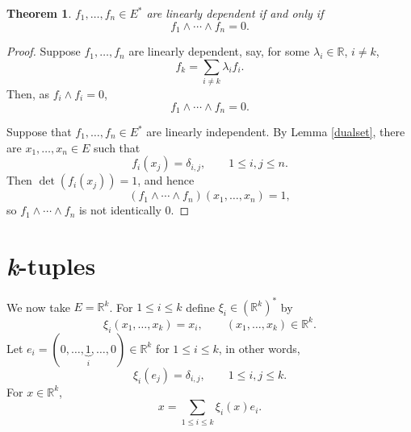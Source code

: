 \documentclass{article}
\newtheorem{theorem}{Theorem}
\theoremstyle{definition}
\begin{document}
\begin{theorem}
$f_1,\ldots,f_n \in E^*$ are linearly dependent if and only if 
\[
f_1 \wedge \cdots \wedge f_n=0.
\]
\end{theorem}
\begin{proof}
Suppose $f_1,\ldots,f_n$ are linearly dependent, say, for some
$\lambda_i \in \mathbb{R}$, $i \neq k$,
\[
f_k = \sum_{i \neq k} \lambda_i f_i.
\]
Then, as $f_i \wedge f_i =0$,
\[
f_1 \wedge \cdots \wedge f_n = 0.
\]

Suppose
that $f_1,\ldots,f_n \in E^*$ are linearly independent. 
By Lemma \ref{dualset},
there are $x_1,\ldots,x_n \in E$ such that 
\[
f_i(x_j) = \delta_{i,j},\qquad 1 \leq i, j \leq n.
\]
Then $\det (f_i(x_j)) = 1$, and hence 
\[
(f_1 \wedge \cdots \wedge f_n)(x_1,\ldots,x_n) = 1,
\]
so $f_1 \wedge \cdots \wedge f_n$ is not identically $0$.
\end{proof}





\section{{\em k}-tuples}
We now take $E=\mathbb{R}^k$.
For $1 \leq i \leq k$ define $\xi_i \in (\mathbb{R}^k)^*$ by
\[
\xi_i(x_1,\ldots,x_k) = x_i,\qquad (x_1,\ldots,x_k) \in \mathbb{R}^k.
\]
Let $e_i = (0,\ldots,\underbrace{1}_i,\ldots,0) \in \mathbb{R}^k$ for $1 \leq i \leq k$, in other words,
\[
\xi_i(e_j) = \delta_{i,j},\qquad 1 \leq i,j \leq k.
\]  
For $x \in \mathbb{R}^k$,
\[
x = \sum_{1 \leq i \leq k} \xi_i(x)e_i.
\]
\end{document}
